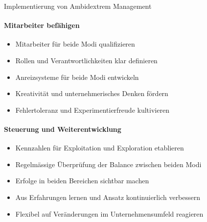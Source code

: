 \begin{KR}{Implementierung von Ambidextrem Management}
\paragraph{Mitarbeiter befähigen}
\begin{itemize}
    \item Mitarbeiter für beide Modi qualifizieren
    \item Rollen und Verantwortlichkeiten klar definieren
    \item Anreizsysteme für beide Modi entwickeln
    \item Kreativität und unternehmerisches Denken fördern
    \item Fehlertoleranz und Experimentierfreude kultivieren
\end{itemize}

\paragraph{Steuerung und Weiterentwicklung}
\begin{itemize}
    \item Kennzahlen für Exploitation und Exploration etablieren
    \item Regelmässige Überprüfung der Balance zwischen beiden Modi
    \item Erfolge in beiden Bereichen sichtbar machen
    \item Aus Erfahrungen lernen und Ansatz kontinuierlich verbessern
    \item Flexibel auf Veränderungen im Unternehmensumfeld reagieren
\end{itemize}
\end{KR}


